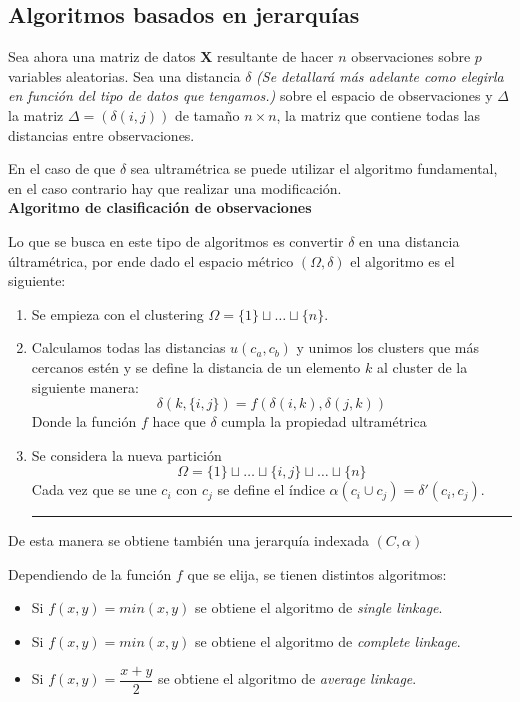 \subsection{Algoritmos basados en jerarquías}
\noindent Sea ahora una matriz de datos $\textbf{X}$ resultante de hacer $n$ observaciones sobre $p$ variables aleatorias. Sea una distancia $\delta$ \textit{(Se detallará más adelante como elegirla en función del tipo de datos que tengamos.)} sobre el espacio de observaciones y $\Delta$ la matriz $\Delta=(\delta(i,j))$ de tamaño $n \times n$, la matriz que contiene todas las distancias entre observaciones. 

\noindent En el caso de que $\delta$ sea ultramétrica se puede utilizar el algoritmo fundamental, en el caso contrario hay que realizar una modificación. \\

\noindent \textbf{Algoritmo de clasificación de observaciones}

\noindent Lo que se busca en este tipo de algoritmos es convertir $\delta$ en una distancia últramétrica, por ende dado el espacio métrico $(\Omega, \delta)$ el algoritmo es el siguiente:\\
\begin{enumerate}
\hrule
\item Se empieza con el clustering $\Omega= \lbrace 1\rbrace \sqcup \ldots \sqcup\lbrace n \rbrace$. 
\item Calculamos todas las distancias $u(c_a,c_b)$ y unimos los clusters que más cercanos estén y se define la distancia de un elemento $k$ al cluster de la siguiente manera:
\begin{equation}
\delta(k,\lbrace i,j \rbrace)=f(\delta(i,k),\delta(j,k))
\end{equation}
Donde la función $f$ hace que $\delta$ cumpla la propiedad ultramétrica

\item Se considera la nueva partición
\begin{equation}
\Omega= \lbrace 1\rbrace \sqcup\ldots \sqcup \lbrace i,j\rbrace \sqcup \ldots \sqcup\lbrace n \rbrace
\end{equation}
Cada vez que se une $c_i$ con $c_j$ se define el índice $\alpha(c_i\cup c_j)=\delta'(c_i,c_j)$.\\
\hrule
\end{enumerate}
De esta manera se obtiene también una jerarquía indexada $(C,\alpha)$

\noindent Dependiendo de la función $f$ que se elija, se tienen distintos algoritmos:
\begin{itemize}
\item Si $f(x,y)=min(x,y)$ se obtiene el algoritmo de \textit{single linkage}.
\item  Si $f(x,y)=min(x,y)$ se obtiene el algoritmo de \textit{complete linkage}.
\item  Si $f(x,y)=\dfrac{x+y}{2}$ se obtiene el algoritmo de \textit{average linkage}.
\end{itemize}

